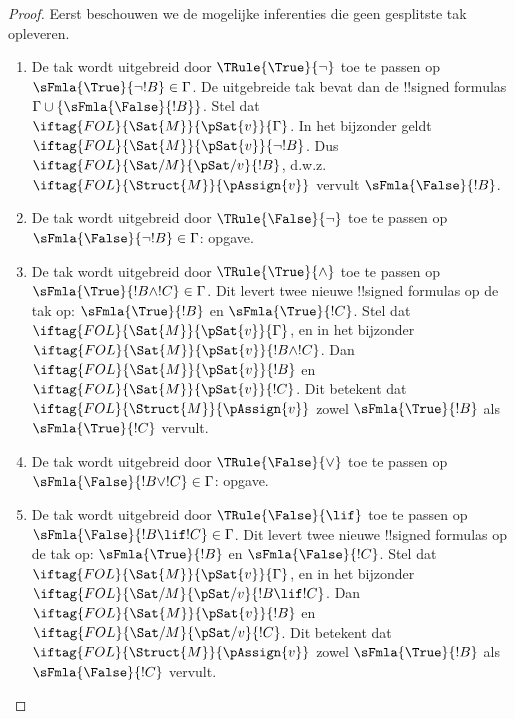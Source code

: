 \documentclass[openany]{memoir}
\begin{document}
\begin{proof}
Eerst beschouwen we de mogelijke inferenties die geen gesplitste tak
opleveren.
\begin{enumerate}
\item De tak wordt uitgebreid door $\TRule{\True}{\lnot}$ toe te
  passen op $\sFmla{\True}{\lnot !B} \in \Gamma$. De uitgebreide tak
  bevat dan de !!{signed formula}s $\Gamma \cup
  \{\sFmla{\False}{!B}\}$. Stel dat
  $\iftag{FOL}{\Sat{M}}{\pSat{v}}{\Gamma}$. In het bijzonder geldt
  $\iftag{FOL}{\Sat{M}}{\pSat{v}}{\lnot !B}$. Dus
  $\iftag{FOL}{\Sat/{M}}{\pSat/{v}}{!B}$, d.w.z.
  $\iftag{FOL}{\Struct{M}}{\pAssign{v}}$ vervult
  $\sFmla{\False}{!B}$.
\item De tak wordt uitgebreid door $\TRule{\False}{\lnot}$ toe te
  passen op $\sFmla{\False}{\lnot !B} \in \Gamma$: opgave.
\item De tak wordt uitgebreid door $\TRule{\True}{\land}$ toe te
  passen op $\sFmla{\True}{!B \land !C} \in \Gamma$. Dit levert twee
  nieuwe !!{signed formula}s op de tak op: $\sFmla{\True}{!B}$ en
  $\sFmla{\True}{!C}$. Stel dat
  $\iftag{FOL}{\Sat{M}}{\pSat{v}}{\Gamma}$, en in het bijzonder
  $\iftag{FOL}{\Sat{M}}{\pSat{v}}{!B \land !C}$. Dan
  $\iftag{FOL}{\Sat{M}}{\pSat{v}}{!B}$ en
  $\iftag{FOL}{\Sat{M}}{\pSat{v}}{!C}$. Dit betekent dat
  $\iftag{FOL}{\Struct{M}}{\pAssign{v}}$ zowel
  $\sFmla{\True}{!B}$ als $\sFmla{\True}{!C}$ vervult.
\item De tak wordt uitgebreid door $\TRule{\False}{\lor}$ toe te
  passen op $\sFmla{\False}{!B \lor !C} \in \Gamma$: opgave.
\item De tak wordt uitgebreid door $\TRule{\False}{\lif}$ toe te
  passen op $\sFmla{\False}{!B \lif !C} \in \Gamma$. Dit levert twee
  nieuwe !!{signed formula}s op de tak op: $\sFmla{\True}{!B}$ en
  $\sFmla{\False}{!C}$. Stel dat
  $\iftag{FOL}{\Sat{M}}{\pSat{v}}{\Gamma}$, en in het bijzonder
  $\iftag{FOL}{\Sat/{M}}{\pSat/{v}}{!B \lif !C}$. Dan
  $\iftag{FOL}{\Sat{M}}{\pSat{v}}{!B}$ en
  $\iftag{FOL}{\Sat/{M}}{\pSat/{v}}{!C}$. Dit betekent dat
  $\iftag{FOL}{\Struct{M}}{\pAssign{v}}$ zowel
  $\sFmla{\True}{!B}$ als $\sFmla{\False}{!C}$ vervult.

\end{enumerate}
\end{proof}
\end{document}
